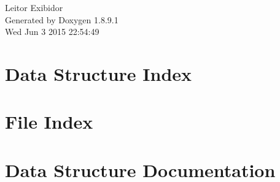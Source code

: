 \documentclass[twoside]{book}
\newcommand{\+}{\discretionary{\mbox{\scriptsize$\hookleftarrow$}}{}{}}
\newcommand{\clearemptydoublepage}{%
  \newpage{\pagestyle{empty}\cleardoublepage}%
}
\begin{document}
\hypersetup{pageanchor=false,
             bookmarks=true,
             bookmarksnumbered=true,
             pdfencoding=unicode
            }
\begin{titlepage}
\vspace*{7cm}
\begin{center}%
{\Large Leitor Exibidor }\\
\vspace*{1cm}
{\large Generated by Doxygen 1.8.9.1}\\
\vspace*{0.5cm}
{\small Wed Jun 3 2015 22:54:49}\\
\end{center}
\end{titlepage}
\clearemptydoublepage
\tableofcontents
\clearemptydoublepage
{}
\hypersetup{pageanchor=true}

\chapter{Data Structure Index}

\chapter{File Index}

\chapter{Data Structure Documentation}













\end{document}

